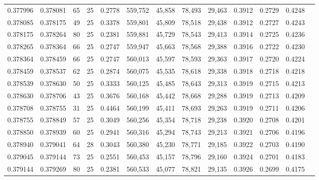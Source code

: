 \begin{tabular}{rrrrrrrrrrrrr}
0.377996 & 0.378081 &    65 &  25 &                                     0.2778 & 559,752 &  45,858 &  78,493 &  29,463 & 0.3912 & 0.2729 & 0.4248 \\
0.378085 & 0.378175 &    49 &  25 &                                     0.3378 & 559,801 &  45,809 &  78,518 &  29,438 & 0.3912 & 0.2727 & 0.4243 \\
0.378175 & 0.378264 &    80 &  25 &                                     0.2381 & 559,881 &  45,729 &  78,543 &  29,413 & 0.3914 & 0.2725 & 0.4236 \\
0.378265 & 0.378364 &    66 &  25 &                                     0.2747 & 559,947 &  45,663 &  78,568 &  29,388 & 0.3916 & 0.2722 & 0.4230 \\
0.378364 & 0.378459 &    66 &  25 &                                     0.2747 & 560,013 &  45,597 &  78,593 &  29,363 & 0.3917 & 0.2720 & 0.4224 \\
0.378459 & 0.378537 &    62 &  25 &                                     0.2874 & 560,075 &  45,535 &  78,618 &  29,338 & 0.3918 & 0.2718 & 0.4218 \\
0.378539 & 0.378630 &    50 &  25 &                                     0.3333 & 560,125 &  45,485 &  78,643 &  29,313 & 0.3919 & 0.2715 & 0.4213 \\
0.378630 & 0.378706 &    43 &  25 &                                     0.3676 & 560,168 &  45,442 &  78,668 &  29,288 & 0.3919 & 0.2713 & 0.4209 \\
0.378708 & 0.378755 &    31 &  25 &                                     0.4464 & 560,199 &  45,411 &  78,693 &  29,263 & 0.3919 & 0.2711 & 0.4206 \\
0.378755 & 0.378849 &    57 &  25 &                                     0.3049 & 560,256 &  45,354 &  78,718 &  29,238 & 0.3920 & 0.2708 & 0.4201 \\
0.378850 & 0.378939 &    60 &  25 &                                     0.2941 & 560,316 &  45,294 &  78,743 &  29,213 & 0.3921 & 0.2706 & 0.4196 \\
0.378940 & 0.379041 &    64 &  28 &                                     0.3043 & 560,380 &  45,230 &  78,771 &  29,185 & 0.3922 & 0.2703 & 0.4190 \\
0.379045 & 0.379144 &    73 &  25 &                                     0.2551 & 560,453 &  45,157 &  78,796 &  29,160 & 0.3924 & 0.2701 & 0.4183 \\
0.379144 & 0.379269 &    80 &  25 &                                     0.2381 & 560,533 &  45,077 &  78,821 &  29,135 & 0.3926 & 0.2699 & 0.4175 \\

\end{tabular}
